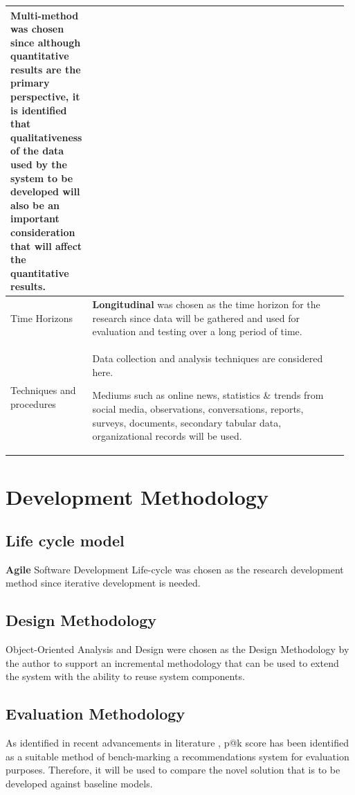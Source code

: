 \documentclass[a4paper, 12pt, oneside]{report}
\begin{document}
\begin{longtable}{| p{0.22\linewidth} | p{0.75\linewidth}|}
\textbf{Multi-method} was chosen since although \textbf{quantitative results} are the primary  perspective, it is identified that \textbf{qualitativeness} of the data used by the system to be developed will also be an important consideration that will affect the quantitative results.\\
\hline
Time Horizons  & 

\textbf{Longitudinal} was chosen as the time horizon for the research since data will be gathered and used for evaluation and testing over a long period of time.\\
\hline
Techniques and procedures &  Data collection and analysis techniques are considered here.

Mediums such as online news, statistics \& trends from social media, observations, conversations, reports, surveys, documents, secondary tabular data, organizational records will be used.\\
\hline
\end{longtable}


\section{Development Methodology}
\subsection{Life cycle model}
\textbf{Agile} Software Development Life-cycle was chosen as the research development method since iterative development is needed.

\subsection{Design Methodology}
Object-Oriented Analysis and Design were chosen as the Design Methodology by the author to support an incremental methodology that can be used to extend the system with the ability to reuse system components.

\subsection{Evaluation Methodology}
As identified in recent advancements in literature \autocite{larry_history_2019}, \gls{p@k} score has been identified as a suitable method of bench-marking a recommendations system for evaluation purposes. Therefore, it will be used to compare the novel solution that is to be developed against baseline models.
\end{document}
